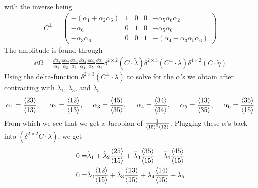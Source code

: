 \documentclass[a4paper,12pt]{article}
\begin{document}
with the inverse being
\begin{equation}
	\begin{aligned}
		C^\perp =\begin{pmatrix}
			-(\alpha_1+\alpha_2\alpha_6) & 1 & 0 & 0 & -\alpha_5 \alpha_6 \alpha_2\\
			-\alpha_6 & 0 & 1 & 0 & -\alpha_5 \alpha_6 \\
			-\alpha_3 \alpha_6 & 0 & 0 & 1 & -(\alpha_4+\alpha_3\alpha_5\alpha_6)
		\end{pmatrix}
	\end{aligned}
\end{equation}
The amplitude is found through
\begin{equation}
	\begin{aligned}
		\dd \Omega =\frac{\dd \alpha_1}{\alpha_1}\frac{\dd \alpha_2}{\alpha_2}\frac{\dd \alpha_3}{\alpha_3}\frac{\dd \alpha_4}{\alpha_4}\frac{\dd \alpha_5}{\alpha_5}\frac{\dd \alpha_6}{\alpha_6}\delta^{2\times 2}(C\cdot \tilde \lambda) \delta^{2\times 3}(C^\perp\cdot \lambda)\delta^{4\times 2}(C\cdot \tilde \eta)
	\end{aligned}
\end{equation}
Using the delta-function $\delta^{2\times 3}(C^\perp\cdot \lambda)$ to solve for the $\alpha$'s we obtain after contracting with $\lambda_1$, $\lambda_3$, and $\lambda_5$
\begin{equation}
	\begin{aligned}
		\alpha_1=\frac{\expval{23}}{\expval{13}},~~~~
		\alpha_2=\frac{\expval{12}}{\expval{13}},~~~~
		\alpha_3=\frac{\expval{45}}{\expval{35}},~~~~
		\alpha_4=\frac{\expval{34}}{\expval{34}},~~~~
		\alpha_5=\frac{\expval{13}}{\expval{35}},~~~~
		\alpha_6=\frac{\expval{35}}{\expval{15}}
	\end{aligned}
\end{equation}
From which we see that we get a Jacobian of $\frac{1}{\expval{15}^2\expval{13}}$. Plugging these $\alpha$'s back into $(\delta^{2\times 2}C\cdot\tilde \lambda)$, we get
\begin{equation}
	\begin{aligned}
0=&\tilde\lambda_1
+
\tilde\lambda_2 \frac{\expval{25}}{\expval{15}}
+
\tilde\lambda_3
\frac{\expval{35}}{\expval{15}}
+
\tilde\lambda_4
\frac{\expval{45}}{\expval{15}}\\
0=&\tilde\lambda_2 \frac{\expval{12}}{\expval{15}}
+
\tilde\lambda_3
\frac{\expval{13}}{\expval{15}}
+
\tilde\lambda_4 \frac{\expval{14}}{\expval{15}}
+
\tilde\lambda_5
\end{aligned}
\end{equation}
\end{document}
